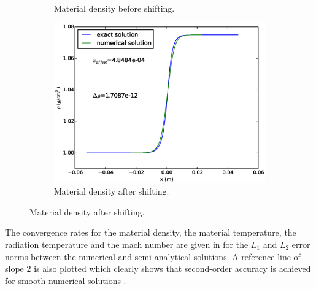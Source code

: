 \documentclass[times,doublespace]{fldauth}%
\begin{document}
\begin{figure}[H]
\begin{subfigure}{0.33\textwidth}
    \caption{Material density before shifting.}\label{fig:mach-1p05-cst-xs-density-no-shift}
    \end{subfigure}
    \begin{subfigure}{0.33\textwidth}
    \centering
    \includegraphics[width=\linewidth]{figures/cst-xs/mach-1p05-density-nel-50.eps}
    \caption{Material density after shifting.}\label{fig:mach-1p05-cst-xs-density-with-shift}
    \end{subfigure}
\end{figure}
%
The convergence rates for the material density, the material temperature, the radiation temperature and the mach number are given in  for the $L_1$ and $L_2$ error norms between the numerical and semi-analytical solutions. A reference line of slope $2$ is also plotted which clearly shows that second-order accuracy is achieved for smooth numerical solutions
.
%
\end{document}
